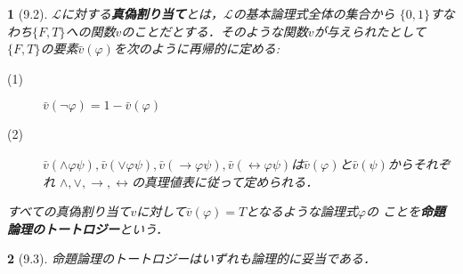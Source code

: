 \documentclass[a4j,10.5pt,oneside,openany]{jsbook}
\theoremstyle{mystyle}
\newtheorem{thm}{\color{DarkMidnightBlue}{定理}}[section]
\newtheorem{dfn}[thm]{\color{PakistanGreen}{定義}}
\begin{document}
	\begin{screen}
		\begin{dfn}[9.2]
			$\mathcal{L}$に対する{\bf 真偽割り当て}とは，$\mathcal{L}$の基本論理式全体の集合から
			$\{0,1\}$すなわち$\{F,T\}$への関数$v$のことだとする．そのような関数$v$が与えられたとして
			$\{F,T\}$の要素$\bar{v}(\varphi)$を次のように再帰的に定める:
			\begin{description}
				\item[(1)] $\bar{v}(\neg \varphi) = 1 - \bar{v}(\varphi)$
				\item[(2)] $\bar{v}(\wedge \varphi \psi), \bar{v}(\vee \varphi\psi),
					\bar{v}(\rightarrow \varphi\psi), \bar{v}(\leftrightarrow
					\varphi\psi)$は$\bar{v}(\varphi)$と$\bar{v}(\psi)$からそれぞれ
					$\wedge,\vee,\rightarrow,\leftrightarrow$の真理値表に従って定められる．
			\end{description}
			すべての真偽割り当て$v$に対して$\bar{v}(\varphi) = T$となるような論理式$\varphi$の
			ことを{\bf 命題論理のトートロジー}という．
		\end{dfn}
	\end{screen}
	
	\begin{screen}
		\begin{thm}[9.3]
			命題論理のトートロジーはいずれも論理的に妥当である．
		\end{thm}
	\end{screen}
	
\end{document}
